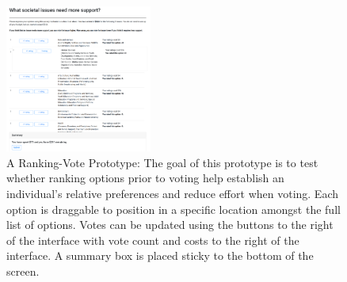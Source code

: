 \begin{figure}[h]
    \centering
    \includegraphics[width=0.43\textwidth]{content/image/prototypes/2_ranking.png}
    \caption{A Ranking-Vote Prototype: The goal of this prototype is to test whether ranking options prior to voting help establish an individual's relative preferences and reduce effort when voting. Each option is draggable to position in a specific location amongst the full list of options. Votes can be updated using the buttons to the right of the interface with vote count and costs to the right of the interface. A summary box is placed sticky to the bottom of the screen.}
    \label{fig:qv_rank}
\end{figure}

